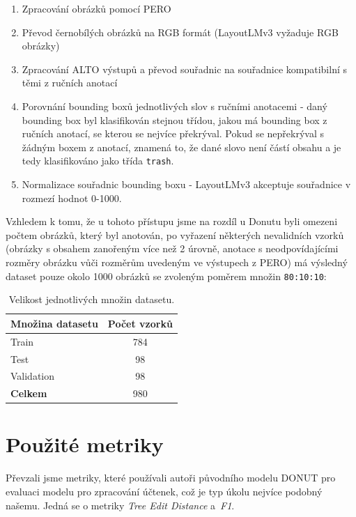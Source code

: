 \documentclass{article}
\begin{document}
\begin{enumerate}
    \item{Zpracování obrázků pomocí PERO}
    \item{Převod černobílých obrázků na RGB formát (LayoutLMv3 vyžaduje RGB obrázky)}
    \item{Zpracování ALTO výstupů a převod souřadnic na souřadnice kompatibilní s těmi z ručních anotací}
    \item{Porovnání bounding boxů jednotlivých slov s ručními anotacemi - daný bounding box byl klasifikován stejnou třídou, jakou má bounding box z ručních anotací, se kterou se nejvíce překrýval. Pokud se nepřekrýval s žádným boxem z anotací, znamená to, že dané slovo není částí obsahu a je tedy klasifikováno jako třída \verb|trash|.}
    \item{Normalizace souřadnic bounding boxu - LayoutLMv3 akceptuje souřadnice v rozmezí hodnot 0-1000}.
\end{enumerate}

Vzhledem k tomu, že u tohoto přístupu jsme na rozdíl u Donutu byli omezeni počtem obrázků, který byl anotován, po vyřazení některých nevalidních vzorků (obrázky s obsahem zanořeným více než 2 úrovně, anotace s neodpovídajícími rozměry obrázku vůči rozměrům uvedeným ve výstupech z PERO) má výsledný dataset pouze okolo 1000 obrázků se zvoleným poměrem množin \verb|80:10:10|:
\begin{table}[htbp]
\centering
\begin{tabular}{lc}
\hline
\textbf{Množina datasetu} & \textbf{Počet vzorků} \\
\hline
Train & 784 \\
Test & 98 \\
Validation & 98 \\
\hline
\textbf{Celkem} & 980 \\

\hline
\end{tabular}
\caption{Velikost jednotlivých množin datasetu.}
\label{tab:dataset_info}
\end{table}

\section{Použité metriky}
Převzali jsme metriky, které používali autoři původního modelu DONUT pro evaluaci modelu pro zpracování účtenek, což je typ úkolu nejvíce podobný našemu. Jedná se o metriky \textit{Tree Edit Distance} a~\textit{F1}.
\end{document}
